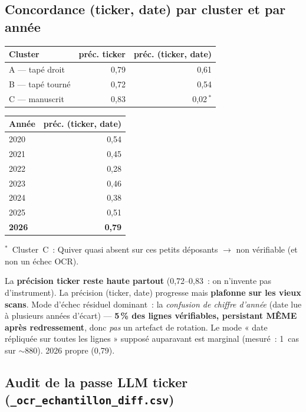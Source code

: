\documentclass[11pt,a4paper]{article}
\newcommand{\file}[1]{\texttt{\small #1}}
\begin{document}
\subsection*{Concordance (ticker, date) par cluster et par année}

\begin{center}
\begin{tabular}{@{}l r r@{}}
\toprule
\textbf{Cluster} & \textbf{préc. ticker} & \textbf{préc. (ticker, date)} \\
\midrule
A --- tapé droit  & 0,79 & 0,61 \\
B --- tapé tourné & 0,72 & 0,54 \\
C --- manuscrit   & 0,83 & 0,02\,$^{*}$ \\
\bottomrule
\end{tabular}
\hspace{1.2cm}
\begin{tabular}{@{}l r@{}}
\toprule
\textbf{Année} & \textbf{préc. (ticker, date)} \\
\midrule
2020 & 0,54 \\
2021 & 0,45 \\
2022 & 0,28 \\
2023 & 0,46 \\
2024 & 0,38 \\
2025 & 0,51 \\
\textbf{2026} & \textbf{0,79} \\
\bottomrule
\end{tabular}
\end{center}

\noindent\footnotesize $^{*}$~Cluster~C~: Quiver quasi absent sur ces petits déposants
$\to$ non vérifiable (et non un échec OCR).\normalsize

\medskip
\noindent La \textbf{précision ticker reste haute partout} (0,72--0,83~: on n'invente pas
d'instrument). La précision (ticker, date) progresse mais \textbf{plafonne sur les vieux
scans}. Mode d'échec résiduel dominant~: la \emph{confusion de chiffre d'année} (date lue
à plusieurs années d'écart) --- \textbf{5\,\% des lignes vérifiables, persistant MÊME après
redressement}, donc \emph{pas} un artefact de rotation. Le mode « date répliquée sur toutes
les lignes » supposé auparavant est marginal (mesuré~: 1~cas sur $\sim$880). 2026 propre (0,79).

\subsection*{Audit de la passe LLM ticker (\file{\_ocr\_echantillon\_diff.csv})}
\end{document}
